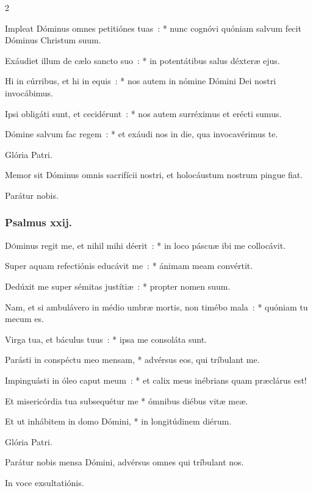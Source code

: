 \documentclass[9pt,twoside]{extarticle}
\begin{document}
\begin{multicols}{2}
{Impleat Dóminus omnes petitiónes tuas~: * nunc cognóvi quóniam salvum fecit Dóminus Christum suum.

Exáudiet illum de cælo sancto suo~: * in potentátibus salus déxteræ ejus.

Hi in cúrribus, et hi in equis~: * nos autem in nómine Dómini Dei nostri invocábimus.

Ipsi obligáti sunt, et cecidérunt~: * nos autem surréximus et erécti sumus.

Dómine salvum fac regem~: * et exáudi nos in die, qua invocavérimus te.

Glória Patri.

\begin{tightlist}{}
\item {} Memor sit Dóminus omnis sacrifícii nostri, et holocáustum nostrum pingue fiat.
\item {} Parátur nobis.
\end{tightlist}

\subsubsection*{\center Psalmus xxij.}
\lettrine{D}óminus regit me, et nihil mihi déerit~: * in loco páscuæ ibi me collocávit.

Super aquam refectiónis educávit me~: * ánimam meam convértit.

Dedúxit me super sémitas justítiæ~: * propter nomen suum.

Nam, et si ambulávero in médio umbræ mortis, non timébo mala~: * quóniam tu mecum es.

Virga tua, et báculus tuus~: * ipsa me consoláta sunt.

Parásti in conspéctu meo mensam, * advérsus eos, qui tríbulant me.

Impinguásti in óleo caput meum~: * et calix meus inébrians quam præclárus est!

Et misericórdia tua subsequétur me * ómnibus diébus vitæ meæ.

Et ut inhábitem in domo Dómini, * in longitúdinem diérum.

Glória Patri.

\begin{tightlist}{}
\item {} Parátur nobis mensa Dómini, advérsus omnes qui tríbulant nos.
\item {} In voce exsultatiónis.
\end{tightlist}

}
\end{multicols}
\end{document}
